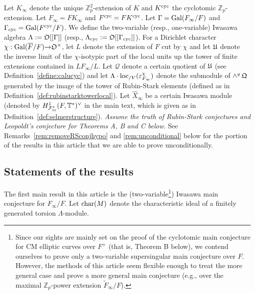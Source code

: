 \documentclass[12pt]{amsart}
\numberwithin{equation}{section}
\begin{document}
 Let $K_\infty$ denote the unique ${\mathbb{Z}}_p^2$-extension of $K$ and $K^{\textup{cyc}}$ the cyclotomic ${\mathbb{Z}}_p$-extension. Let $F_\infty=FK_\infty$ and $F^{\textup{cyc}}=FK^{\textup{cyc}}$. Let $\Gamma=\textup{Gal}(F_\infty/F)$ and $\Gamma_{\textup{cyc}}=\textup{Gal}(F^\textup{cyc}/F)$. We define the two-variable (resp., one-variable) Iwasawa algebra ${\Lambda}:={\frak{O}}[[\Gamma]]$ (resp., ${\Lambda}_{\textup{cyc}}:={\frak{O}}[[\Gamma_\textup{cyc}]]$). For a Dirichlet character $\chi:\textup{Gal}(\overline{F}/F){\rightarrow} {\frak{O}}^\times$, let $L$ denote the extension of $F$ cut by $\chi$ and let $\frak{U}$ denote the inverse limit of the $\chi$-isotypic part of the local units up the tower of finite extensions contained in $LF_\infty/L$. Let $\mathcal{Q}$ denote a certain quotient of $\frak{U}$ (see Definition~\ref{define:calucyc}) and let ${\Lambda}\cdot{\textup{loc}_{/V}}(\varepsilon_{F_\infty}^\chi)$ denote the submodule of $\wedge^g \,\frak{Q}$ generated by the image of the tower of Rubin-Stark elements (defined as in Definition~\ref{def:rubinstarktowerlocal}). Let $\widehat{X}_\infty$ be a certain Iwasawa module (denoted by $H^1_{{\mathcal{F}}_{\frak{tr}}^*}(F,{\mathbb{T}}^*)^\vee$ in the main text, which is given as in Definition~\ref{def:selmerstructure}). \emph{Assume the truth of Rubin-Stark conjectures and Leopoldt's conjecture for Theorems A, B and C below.} See Remarks~\ref{rem:removeRSconjhypo} and \ref{rem:unconditional} below for the portion of the results in this article that we are able to prove unconditionally.
\subsection*{Statements of the results}
The first main result in this article is the (two-variable\footnote{Since our sights are mainly set on the proof of the cyclotomic main conjecture for CM elliptic curves over $F^+$ (that is, Theorem B below), we contend ourselves to prove only a two-variable supersingular main conjecture over $F$. However, the methods of this article seem flexible enough to treat the more general case and prove a more general main conjecture (e.g., over the maximal ${\mathbb{Z}}_p$-power extension $\widetilde{F}_{\infty}/F$).}) Iwasawa main conjecture for $F_\infty/F$. Let ${\textup{char}}(M)$ denote the characteristic ideal of a finitely generated torsion ${\Lambda}$-module.
\end{document}
